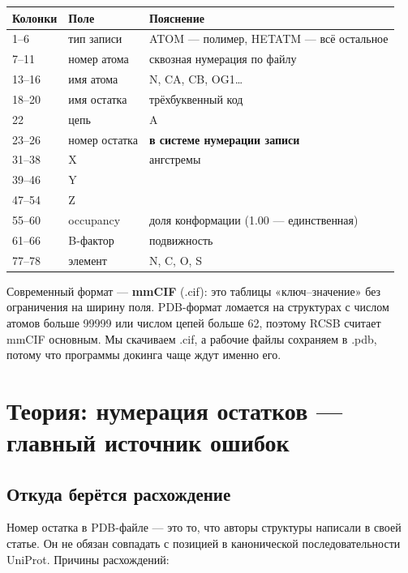 \documentclass[12pt,a4paper]{article}
\newcommand{\code}[1]{{\ttfamily #1}}
\begin{document}
\begin{center}
\begin{tabular}{L{2.2cm}L{3.6cm}L{8.4cm}}
\toprule
\textbf{Колонки} & \textbf{Поле} & \textbf{Пояснение} \\
--6 & тип записи & \code{ATOM} --- полимер, \code{HETATM} --- всё остальное \\
7--11 & номер атома & сквозная нумерация по файлу \\
13--16 & имя атома & \code{N}, \code{CA}, \code{CB}, \code{OG1}\ldots \\
18--20 & имя остатка & трёхбуквенный код \\
22 & цепь & \code{A} \\
23--26 & номер остатка & \textbf{в системе нумерации записи} \\
31--38 & X & ангстремы \\
39--46 & Y & \\
47--54 & Z & \\
55--60 & occupancy & доля конформации (1.00 --- единственная) \\
61--66 & B-фактор & подвижность \\
77--78 & элемент & \code{N}, \code{C}, \code{O}, \code{S} \\
\bottomrule
\end{tabular}
\end{center}

Современный формат --- \textbf{mmCIF} (\code{.cif}): это таблицы «ключ--значение»
без ограничения на ширину поля. PDB-формат ломается на структурах с числом атомов
больше 99999 или числом цепей больше 62, поэтому RCSB считает mmCIF основным.
Мы скачиваем \code{.cif}, а рабочие файлы сохраняем в \code{.pdb}, потому что
программы докинга чаще ждут именно его.

\section{Теория: нумерация остатков --- главный источник ошибок}

\subsection{Откуда берётся расхождение}

Номер остатка в PDB-файле --- это то, что авторы структуры написали в своей статье.
Он не обязан совпадать с позицией в канонической последовательности UniProt.
Причины расхождений:
\end{document}
